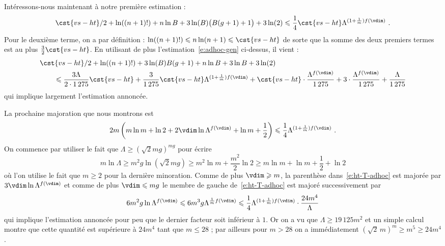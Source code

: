 Intéressons-nous maintenant à notre première estimation  :
\begin{equation} \label{e:B-siegel}
  \cst{vs-ht}/2 + \ln((n+1)!) + n \ln B
  + 3 \ln(B) \bigl( B(g+1) + 1 \bigr) + 3 \ln(2)
  \le
  \frac14 \cst{vs-ht} \Lambda^{(1 + \frac1m) f(\vdim)}
  \pmm.
\end{equation}
Pour le deuxième terme, on a par définition :
\(
  \ln((n+1)!)
  \le
  n \ln (n+1)
  \le
  \cst{vs-ht}
\)
de sorte que la somme des deux premiers termes est au plus \( \frac32
  \cst{vs-ht} \).
En utilisant de plus l'estimation~\eqref{e:adhoc-gen} ci-dessus, il vient :
\begin{align}
  & \cst{vs-ht}/2 + \ln((n+1)!)
  + 3 \ln(B) B(g+1) + n \ln B + 3\ln B + 3 \ln(2)
  \\ & \qquad \le
  \frac{3\Lambda}{2\cdot1\,275} \cst{vs-ht}
  + \frac3{1\,275} \cst{vs-ht} \Lambda^{(1 + \frac1m) f(\vdim)}
  + \cst{vs-ht} \cdot \frac{ \Lambda^{f(\vdim)} }{ 1\,275 }
  + 3 \cdot \frac{ \Lambda^{f(\vdim)} }{ 1\,275 }
  + \frac{ \Lambda }{ 1\,275 }
\end{align}
qui implique largement l'estimation annoncée.

\medskip

La prochaine majoration  que nous montrons est
\begin{equation} \label{e:ht-T-adhoc}
  2m \left(
    m \ln m + \ln 2 + 2\vdim \ln \Lambda^{f(\vdim)}
    + \ln m + \frac12
  \right)
  \le
  \frac14 \Lambda^{ (1 + \frac1m) f(\vdim) }
  \pmm.
\end{equation}
On commence par utiliser le fait que \( \Lambda \ge (\sqrt2
  mg)^{mg} \) pour écrire
\begin{equation}
  m \ln \Lambda
  \ge
  m^2 g \ln( \sqrt2 m g )
  \ge
  m^2 \ln m + \frac{ m^2 }2 \ln 2
  \ge
  m \ln m + \ln m + \frac12 + \ln 2
\end{equation}
où l'on utilise le fait que \( m \ge 2 \) pour la dernière minoration.
Comme de plus \( \vdim \ge m \), la parenthèse dans~\eqref{e:ht-T-adhoc}
est majorée par \( 3\vdim \ln \Lambda^{f(\vdim)} \) et comme de plus \( \vdim
  \le mg \) le membre de gauche de~\eqref{e:ht-T-adhoc} est majoré
successivement par
\begin{equation}
  6 m^2 g \ln \Lambda^{f(\vdim)}
  \le
  6 m^3 g \Lambda^{\frac1m f(\vdim)}
  \le
  \frac14 \Lambda^{(1 + \frac1m) f(\vdim)}
  \cdot \frac{ 24 m^4 }{ \Lambda }
\end{equation}
qui implique l'estimation annoncée pour peu que le dernier facteur soit
inférieur à \( 1 \). Or on a vu que \( \Lambda \ge 19\,125 m^2 \) et un
simple calcul montre que cette quantité est supérieure à \( 24 m^4 \)
tant que \( m \le 28 \) ; par ailleurs pour \( m > 28 \) on a
immédiatement \( (\sqrt2 \, m)^m \ge m^5 \ge 24 m^4 \).

